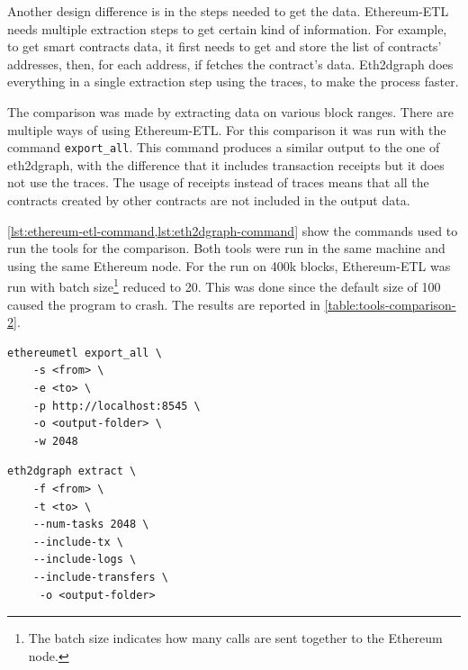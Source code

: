 Another design difference is in the steps needed to get the data. Ethereum-ETL needs multiple extraction steps to get certain kind of information. For example, to get smart contracts data, it first needs to get and store the list of contracts' addresses, then, for each address, if fetches the contract's data. Eth2dgraph does everything in a single extraction step using the traces, to make the process faster.

The comparison was made by extracting data on various block ranges. There are multiple ways of using Ethereum-ETL. For this comparison it was run with the command {\tt export\_all}. This command produces a similar output to the one of eth2dgraph, with the difference that it includes transaction receipts but it does not use the traces. The usage of receipts instead of traces means that all the contracts created by other contracts are not included in the output data. 

\cref{lst:ethereum-etl-command,lst:eth2dgraph-command} show the commands used to run the tools for the comparison. Both tools were run in the same machine and using the same Ethereum node. For the run on 400k blocks, Ethereum-ETL was run with batch size\footnote{The batch size indicates how many calls are sent together to the Ethereum node.} reduced to 20. This was done since the default size of 100 caused the program to crash. The results are reported in \cref{table:tools-comparison-2}. 

\begin{lstlisting}[caption={Command for running Ethereum-ETL in the comparison},label={lst:ethereum-etl-command},captionpos=b,numbers=none]
ethereumetl export_all \
    -s <from> \
    -e <to> \
    -p http://localhost:8545 \
    -o <output-folder> \
    -w 2048
\end{lstlisting}

\begin{lstlisting}[caption={Command for running eth2dgraph in the comparison},label={lst:eth2dgraph-command},captionpos=b,numbers=none]
eth2dgraph extract \
    -f <from> \
    -t <to> \
    --num-tasks 2048 \
    --include-tx \
    --include-logs \
    --include-transfers \
     -o <output-folder> 
\end{lstlisting}

